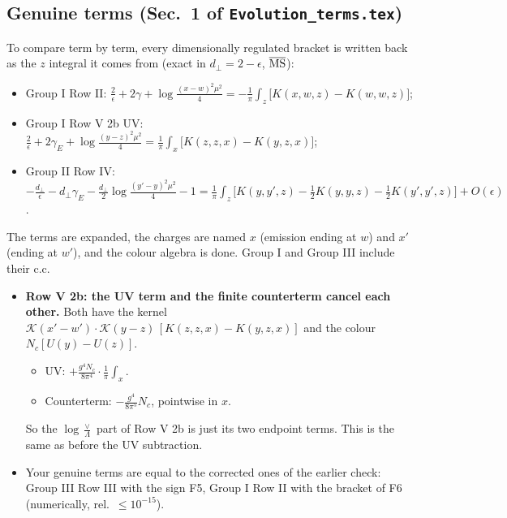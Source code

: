 \documentclass[10pt]{article}
\numberwithin{equation}{section}
\begin{document}
\subsection{Genuine terms (Sec.~1 of \texttt{Evolution\_terms.tex})}\label{sec:gen}
To compare term by term, every dimensionally regulated bracket is written back as the $z$ integral it comes from (exact in $d_\perp=2-\epsilon$, $\overline{\rm MS}$):
\begin{itemize}
\item Group I Row II: $\frac{2}{\epsilon}+2\gamma+\log\frac{(x-w)^2\mu^2}{4}=-\frac1\pi\int_z\big[K(x,w,z)-K(w,w,z)\big]$;
\item Group I Row V 2b UV: $\frac{2}{\epsilon}+2\gamma_E+\log\frac{(y-z)^2\mu^2}{4}=\frac1\pi\int_x\big[K(z,z,x)-K(y,z,x)\big]$;
\item Group II Row IV: $-\frac{d_\perp}{\epsilon}-d_\perp\gamma_E-\frac{d_\perp}{2}\log\frac{(y'-y)^2\mu^2}{4}-1=\frac1\pi\int_z\big[K(y,y',z)-\frac12K(y,y,z)-\frac12K(y',y',z)\big]+O(\epsilon)$.
\end{itemize}
The terms are expanded, the charges are named $x$ (emission ending at $w$) and $x'$ (ending at $w'$), and the colour algebra is done. Group I and Group III include their c.c.
\begin{itemize}
\item \textbf{Row V 2b: the UV term and the finite counterterm cancel each other.} Both have the kernel $\mathcal K(x'-w')\cdot\mathcal K(y-z)\,[K(z,z,x)-K(y,z,x)]$ and the colour $N_c[U(y)-U(z)]$.
\begin{itemize}
\item UV: $+\frac{g^4N_c}{8\pi^4}\cdot\frac1\pi\int_x$.
\item Counterterm: $-\frac{g^4}{8\pi^5}N_c$, pointwise in $x$.
\end{itemize}
So the $\log\frac{\vee}{\Lambda}$ part of Row V 2b is just its two endpoint terms. This is the same as before the UV subtraction.
\item Your genuine terms are equal to the corrected ones of the earlier check: Group III Row III with the sign F5, Group I Row II with the bracket of F6 (numerically, rel.\ $\le10^{-15}$).
\end{itemize}
\end{document}
